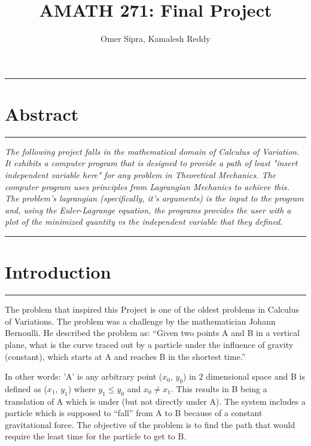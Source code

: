 \documentclass[hidelinks, 11pt]{article}
\title{AMATH 271: Final Project}
\author{Omer Sipra, Kamalesh Reddy}
\begin{document}
\maketitle

\begin{center}
  \noindent\rule{16cm}{0.4pt}
  \section*{Abstract} %
  \noindent\rule{16cm}{0.4pt}
\end{center}

\begin{changemargin}{1cm}{1cm}
\textit{The following project falls in the mathematical domain of Calculus of Variation. It exhibits a computer program that is designed to provide a path of least "insert independent variable here" for any problem in Theoretical Mechanics. The computer program uses principles from Lagrangian Mechanics to achieve this. The problem's lagrangian (specifically, it's arguments) is the input to the program and, using the Euler-Lagrange equation, the programs provides the user with a plot of the minimized quantity vs the independent variable that they defined.}
\end{changemargin}

\begin{center}
  \noindent\rule{16cm}{0.4pt}
  \section*{Introduction} %
  \noindent\rule{16cm}{0.4pt}
\end{center}

The problem that inspired this Project is one of the oldest problems in Calculus of Variations. The problem was a challenge by the mathematician Johann Bernoulli. He described the problem as:
``Given two points A and B in a vertical plane, what is the curve traced out by a particle under the influence of gravity (constant), which starts at A and reaches B in the shortest time.''

In other words: 'A' is any arbitrary point ($x_{0}$, $y_{0}$) in 2 dimensional space and B is defined as ($x_{1}$, $y_{1}$) where $y_{1} \leq y_{0}$ and $x_{0} \neq x_{1}$. This results in B being a translation of A which is under (but not directly under A). The system includes a particle which is supposed to ``fall'' from A to B because of a constant gravitational force. The objective of the problem is to find the path that would require the least time for the particle to get to B. 
\end{document}
